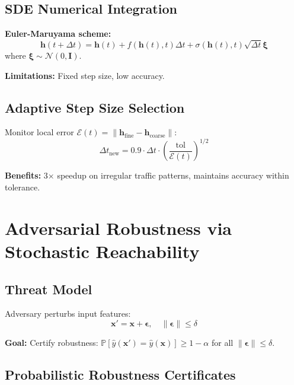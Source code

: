 \documentclass{article}
\begin{document}
\subsection{SDE Numerical Integration}

\textbf{Euler-Maruyama scheme:}
\begin{equation}
\mathbf{h}(t + \Delta t) = \mathbf{h}(t) + f(\mathbf{h}(t), t) \Delta t + \sigma(\mathbf{h}(t), t) \sqrt{\Delta t} \boldsymbol{\xi}
\end{equation}
where $\boldsymbol{\xi} \sim \mathcal{N}(0, \mathbf{I})$.

\textbf{Limitations:} Fixed step size, low accuracy.

\subsection{Adaptive Step Size Selection}

Monitor local error $\mathcal{E}(t) = \|\mathbf{h}_{\text{fine}} - \mathbf{h}_{\text{coarse}}\|$:
\begin{equation}
\Delta t_{\text{new}} = 0.9 \cdot \Delta t \cdot \left(\frac{\text{tol}}{\mathcal{E}(t)}\right)^{1/2}
\end{equation}

\textbf{Benefits:} 3× speedup on irregular traffic patterns, maintains accuracy within tolerance.

\section{Adversarial Robustness via Stochastic Reachability}

\subsection{Threat Model}

Adversary perturbs input features:
\begin{equation}
\mathbf{x}' = \mathbf{x} + \boldsymbol{\epsilon}, \quad \|\boldsymbol{\epsilon}\| \leq \delta
\end{equation}

\textbf{Goal:} Certify robustness: $\mathbb{P}[\hat{y}(\mathbf{x}') = \hat{y}(\mathbf{x})] \geq 1 - \alpha$ for all $\|\boldsymbol{\epsilon}\| \leq \delta$.

\subsection{Probabilistic Robustness Certificates}
\end{document}
